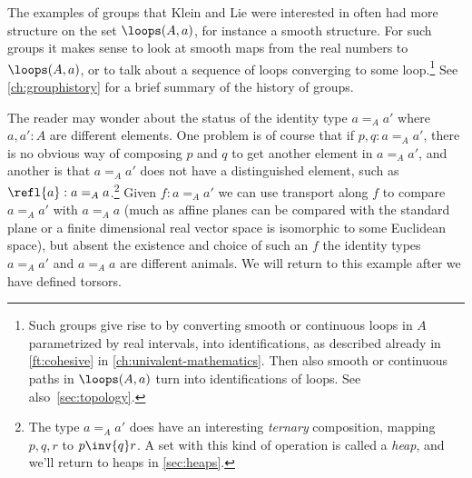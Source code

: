 The examples of groups that Klein and Lie were interested in
often had more structure on the set $\loops(A,a)$,
for instance a smooth structure.
For such groups it makes sense to look at smooth maps from the real numbers
to $\loops(A,a)$,
or to talk about a sequence of loops converging to some loop.\footnote{%
  Such groups give rise to \inftygps by converting
  smooth or continuous loops in $A$
  parametrized by real intervals,
  into identifications,
  as described already in \cref{ft:cohesive}
  in \cref{ch:univalent-mathematics}.
  Then also smooth or continuous paths in $\loops(A,a)$
  turn into identifications of loops.
  See also~\cref{sec:topology}.}
See \cref{ch:grouphistory} for a brief summary of the history of groups.

\begin{remark}\label{rem:heap-preview}
  The reader may wonder about the status of the identity type $a=_Aa'$ where $a,a':A$ are different elements.
  One problem is of course that if $p,q:a=_Aa'$,
  there is no obvious way of composing $p$ and $q$
  to get another element in $a=_A a'$,
  and another is that $a=_Aa'$ does not have a distinguished element,
  such as $\refl{a}:a=_Aa$.\footnote{%
    The type $a=_A a'$ does have an interesting \emph{ternary}
    composition, mapping $p,q,r$ to $p\inv{q}r$.
    A set with this kind of operation is called a \emph{heap},
    and we'll return to heaps in \cref{sec:heaps}.}
Given $f:a=_Aa'$ we can use transport along $f$ to compare $a=_Aa'$ with $a=_Aa$ (much as affine planes can be compared with the standard plane or a finite dimensional real vector space is isomorphic to some Euclidean space), but absent the existence and choice of such an $f$ the identity types $a=_Aa'$ and $a=_Aa$ are different animals.
We will return to this example after we have defined torsors.
\end{remark}


